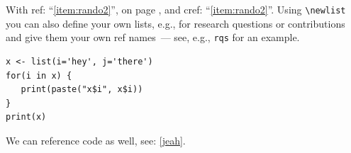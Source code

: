 With ref: \enquote{\ref{item:rando2}}, on page \pageref{item:rando2}, and cref: \enquote{\cref{item:rando2}}.
Using \texttt{\textbackslash newlist} you can also define your own lists, e.g., for research questions or contributions and give them your own ref names~--- see, e.g., \texttt{rqs} for an example.


\begin{verbatim}
x <- list(i='hey', j='there')
for(i in x) {
   print(paste("x$i", x$i))
}
print(x)
\end{verbatim}

We can reference code as well, see: \cref{jeah}.

